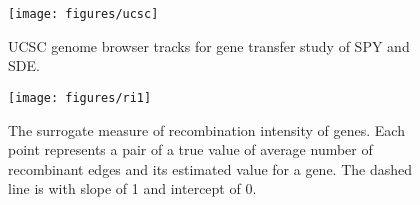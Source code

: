 \documentclass[10pt]{article}
\begin{document}
\begin{figure}
\texttt{[image: figures/ucsc]}
\caption{\label{fig:ucsc}UCSC genome browser tracks for gene transfer study of
SPY and SDE.}
\end{figure}
\clearpage{}%

\begin{figure}
\texttt{[image: figures/ri1]}
\caption{\label{fig:ri1}The surrogate measure of recombination intensity
of genes. Each point represents a pair of a true value of average number of
recombinant edges and its estimated value for a gene. The dashed line is with
slope of 1 and intercept of 0.}
\end{figure}
\clearpage{}%





\end{document}
